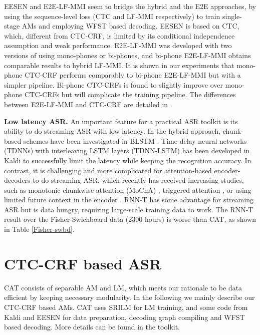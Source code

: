 \documentclass[a4paper]{article}
\begin{document}
EESEN \cite{Miao2015EESEN} and E2E-LF-MMI \cite{hadian2018end,SS-LF-MMI} seem to bridge the hybrid and the E2E approaches, by using the sequence-level loss (CTC and LF-MMI respectively) to train single-stage AMs and employing WFST based decoding.
EESEN is based on CTC, which, different from CTC-CRF, is limited by its conditional independence assumption and weak performance.
E2E-LF-MMI \cite{hadian2018end,SS-LF-MMI} was developed with two versions of using mono-phones or bi-phones, and bi-phone E2E-LF-MMI obtains comparable results to hybrid LF-MMI.
It is shown in our experiments that mono-phone CTC-CRF performs comparably to bi-phone E2E-LF-MMI but with a simpler pipeline. 
Bi-phone CTC-CRFs is found to slightly improve over mono-phone CTC-CRFs but will complicate the training pipeline.
The differences between E2E-LF-MMI and CTC-CRF are detailed in \cite{Xiang2019CRF}.

\textbf{Low latency ASR.}
An important feature for a practical ASR toolkit is its ability to do streaming ASR with low latency.
In the hybrid approach, chunk-based schemes have been investigated in BLSTM \cite{LC-BLSTM,onlineNey}.
Time-delay neural networks (TDNNs) with interleaving LSTM layers (TDNN-LSTM) \cite{Low-latency} has been developed in Kaldi to successfully limit the latency while keeping the recognition accuracy.
In contrast, it is challenging and more complicated for attention-based encoder-decoders to do streaming ASR, which recently has received increasing studies, such as monotonic chunkwise attention (MoChA) \cite{MoChA}, triggered attention \cite{moritz2019triggered}, or using limited future context in the encoder \cite{CAS_transformer}. RNN-T has some advantage for streaming ASR but is data hungry, requiring large-scale training data to work. The RNN-T result over the Fisher-Swichboard data (2300 hours) \cite{transducer} is worse than CAT, as shown in Table \ref{Fisher-swbd}.





\section{CTC-CRF based ASR}
\label{sec:Discriminative training with CRF}
CAT consists of separable AM and LM, which meets our rationale to be data efficient by keeping necessary modularity.
In the following we mainly describe our CTC-CRF based AMs.
CAT uses SRILM for LM training, and some code from Kaldi and EESEN for data preparation, decoding graph compiling and WFST based decoding. 
More details can be found in the toolkit.
\end{document}
